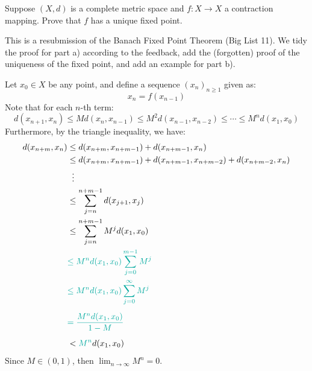 \documentclass{article}
\begin{document}
\newpage
{}

\begin{qu}
    Suppose $ (X, d) $ is a complete metric space and $ f : X \rightarrow X $ a contraction
    mapping. Prove that $ f $ has a unique fixed point.
\end{qu}

This is a resubmission of the Banach Fixed Point Theorem (Big List 11).
We tidy the proof for part a) according to the feedback, add the (forgotten) proof
of the uniqueness of the fixed point, and add an example for part b).

\begin{soln}
    Let $ x_{0} \in X $ be any point, and define a sequence $ (x_{n})_{n \geq 1} $ given as:
    \begin{equation*}
        x_{n} = f(x_{n-1})
    \end{equation*}
    Note that for each $ n $-th term:
    \begin{equation*}
        d(x_{n+1}, x_{n}) \leq Md(x_{n}, x_{n-1}) \leq M^{2}d(x_{n-1}, x_{n-2}) \leq \cdots
        \leq M^{n}d(x_{1}, x_{0})
    \end{equation*}
    Furthermore, by the triangle inequality, we have:
    \begin{align*}
        d(x_{n+m}, x_{n}) & \leq d(x_{n+m}, x_{n+m-1}) + d(x_{n+m-1}, x_{n}) \\
                          & \leq d(x_{n+m}, x_{n+m-1}) + d(x_{n+m-1}, x_{n+m-2})
                          + d(x_{n+m-2}, x_{n}) \\
                          & \ \: \vdots \\
                          & \leq \sum_{j=n}^{n+m-1} d(x_{j+1}, x_{j}) \\
                          & \leq \sum_{j=n}^{n+m-1} M^{j} d(x_{1}, x_{0}) \\
                          & \textcolor{Emerald}{
                            \leq M^{n}d(x_{1}, x_{0})\sum_{j=0}^{m-1} M^{j}
                          } \\
                          & \textcolor{Emerald}{
                            \leq M^{n}d(x_{1}, x_{0})\sum_{j=0}^{\infty}M^{j}
                          } \vsp
                          & \textcolor{Emerald}{
                            = \frac{M^{n}d(x_{1}, x_{0})}{1 - M}
                          } \vsp
                          & < \textcolor{Emerald}{M^{n}}d(x_{1}, x_{0})
    \end{align*}
    Since $ M \in (0, 1) $, then $ \lim_{n \rightarrow \infty} M^{n} = 0 $.

\end{soln}
\end{document}
